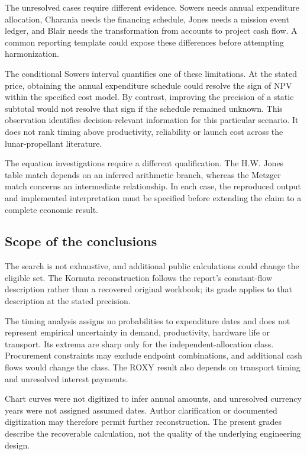 \documentclass[final,5p,times,twocolumn]{elsarticle}
\begin{document}
The unresolved cases require different evidence. Sowers needs annual expenditure allocation, Charania needs the financing schedule, Jones needs a mission event ledger, and Blair needs the transformation from accounts to project cash flow. A common reporting template could expose these differences before attempting harmonization.

The conditional Sowers interval quantifies one of these limitations. At the stated price, obtaining the annual expenditure schedule could resolve the sign of NPV within the specified cost model. By contrast, improving the precision of a static subtotal would not resolve that sign if the schedule remained unknown. This observation identifies decision-relevant information for this particular scenario. It does not rank timing above productivity, reliability or launch cost across the lunar-propellant literature.

The equation investigations require a different qualification. The H.W. Jones table match depends on an inferred arithmetic branch, whereas the Metzger match concerns an intermediate relationship. In each case, the reproduced output and implemented interpretation must be specified before extending the claim to a complete economic result.

\subsection{Scope of the conclusions}
The search is not exhaustive, and additional public calculations could change the eligible set. The Kornuta reconstruction follows the report's constant-flow description rather than a recovered original workbook; its grade applies to that description at the stated precision.

The timing analysis assigns no probabilities to expenditure dates and does not represent empirical uncertainty in demand, productivity, hardware life or transport. Its extrema are sharp only for the independent-allocation class. Procurement constraints may exclude endpoint combinations, and additional cash flows would change the class. The ROXY result also depends on transport timing and unresolved interest payments.

Chart curves were not digitized to infer annual amounts, and unresolved currency years were not assigned assumed dates. Author clarification or documented digitization may therefore permit further reconstruction. The present grades describe the recoverable calculation, not the quality of the underlying engineering design.
\end{document}
